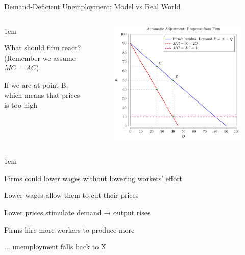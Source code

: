 \documentclass[11pt,aspectratio=43,usenames,dvipsnames]{beamer}
\let\olditemize=\itemize
\let\endolditemize=\enditemize
\renewenvironment{itemize}{\olditemize \itemsep1em}{\endolditemize}
\theoremstyle{definition}
\begin{document}
\begin{frame}[allowframebreaks]{Demand-Deficient Unemployment: Model vs Real World}
    \begin{columns}
        \begin{column}{0.4\textwidth}
            \begin{itemize}
                \item What should firm react? (Remember we assume $ MC = AC $)
                \item If we are at point B, which means that \alert{prices is too high}
            \end{itemize}
        \end{column}
        \begin{column}{0.6\textwidth}
            \begin{figure}
                \centering
                \includegraphics [width=\textwidth]{./figures/build/MRMC.pdf}
            \end{figure}
        \end{column}
    \end{columns}
    \framebreak
    \begin{itemize}
        \item Firms could lower wages without lowering workers’ effort
        \item Lower wages allow them to cut their prices
        \item Lower prices stimulate demand → output rises
        \item Firms hire more workers to produce more
        \item ... unemployment falls back to X
    \end{itemize}


\end{frame}
\end{document}
